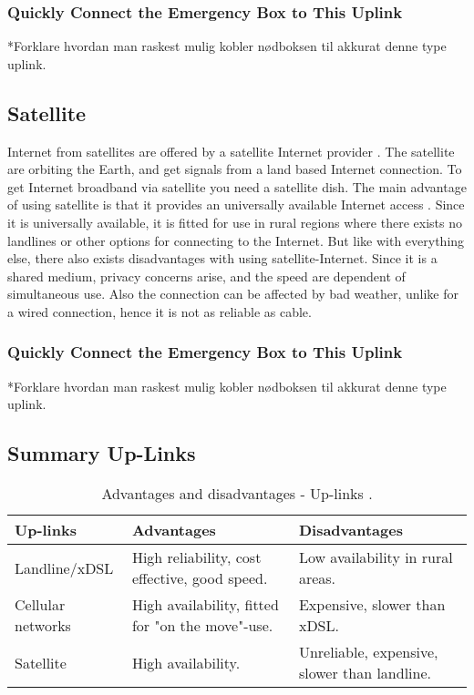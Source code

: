 \subsubsection{Quickly Connect the Emergency Box to This Uplink}
*Forklare hvordan man raskest mulig kobler nødboksen til akkurat denne type uplink.


\subsection{Satellite}
Internet from satellites are offered by a satellite Internet provider \cite{cablevssatellite}. The satellite are orbiting the Earth, and get signals from a land based Internet connection. To get Internet broadband via satellite you need a satellite dish. The main advantage of using satellite is that it provides an universally available Internet access \cite{broadband}. Since it is universally available, it is fitted for use in rural regions where there exists no landlines or other options for connecting to the Internet. But like with everything else, there also exists disadvantages with using satellite-Internet. Since it is a shared medium, privacy concerns arise, and the speed are dependent of simultaneous use. Also the connection can be affected by bad weather, unlike for a wired connection, hence it is not as reliable as cable. 

\subsubsection{Quickly Connect the Emergency Box to This Uplink}
*Forklare hvordan man raskest mulig kobler nødboksen til akkurat denne type uplink.

\subsection{Summary Up-Links}

\begin{center}
\begin{table}[!h]
\caption{\label{tab:uplinks}Advantages and disadvantages - Up-links \cite{comparisonuplinks}.}
    \begin{tabular}{ | l | p{4cm} | p{5cm} |}
    \hline
    \textbf{Up-links} & \textbf{Advantages} & \textbf{Disadvantages} \\ 
    \hline
    Landline/xDSL & High reliability, cost effective, good speed. & Low availability in rural areas. \\ 
    \hline
     Cellular networks & High availability, fitted for "on the move"-use. & Expensive, slower than xDSL.\\
    \hline
    Satellite & High availability.  & Unreliable, expensive, slower than landline.\\ 
    \hline
    \end{tabular}
   \end{table}
\end{center}

